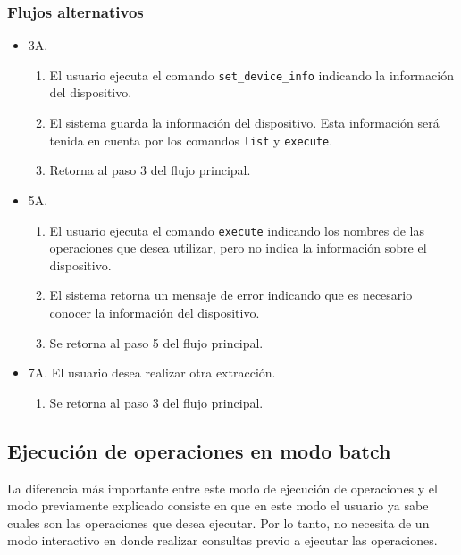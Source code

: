 \subsubsection*{Flujos alternativos}

\begin{itemize}
\item 3A.
    \begin{enumerate}
    \item El usuario ejecuta el comando \texttt{set\_device\_info} indicando la información del dispositivo.
    \item El sistema guarda la información del dispositivo. Esta información será tenida en cuenta por los comandos \texttt{list} y \texttt{execute}.
    \item Retorna al paso 3 del flujo principal.
    \end{enumerate}
\end{itemize}

\begin{itemize}
\item 5A.
    \begin{enumerate}
    \item El usuario ejecuta el comando \texttt{execute} indicando los nombres de las operaciones que desea utilizar, pero no indica la información sobre el dispositivo.
    \item El sistema retorna un mensaje de error indicando que es necesario conocer la información del dispositivo.
    \item Se retorna al paso 5 del flujo principal.
    \end{enumerate}
\end{itemize}

\begin{itemize}
\item 7A. El usuario desea realizar otra extracción.
    \begin{enumerate}
    \item Se retorna al paso 3 del flujo principal.
    \end{enumerate}
\end{itemize}

\subsection{Ejecución de operaciones en modo batch}
La diferencia más importante entre este modo de ejecución de operaciones y el modo previamente explicado consiste en que en este modo el usuario ya sabe cuales son las operaciones que desea ejecutar. Por lo tanto, no necesita de un modo interactivo en donde realizar consultas previo a ejecutar las operaciones.

